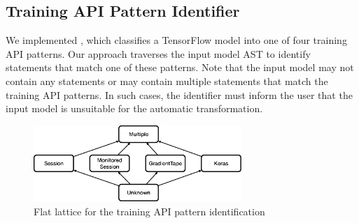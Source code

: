 
\subsection{Training API Pattern Identifier}\label{sec:ident}
We implemented \tapi, which classifies a TensorFlow model into one of four
training API patterns. 
Our approach traverses the input model AST to identify statements that match
one of these patterns. 
Note that the input model may not contain any statements or may contain
multiple statements that match the training API patterns. 
In such cases, the identifier must inform the user that the input model is
unsuitable for the automatic transformation.

\begin{figure}[ht!]
  \centering
  \includegraphics[width=0.7\textwidth]{Fig13.eps}
  \caption{Flat lattice for the training API pattern identification}
  \label{fig:pattern:lattice}
\end{figure}

